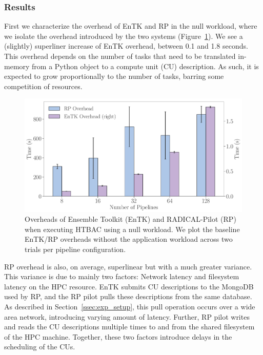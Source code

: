 \subsubsection{Results}\label{ssec:exp_results}

First we characterize the overhead of EnTK and RP in the null workload, where
we isolate the overhead introduced by the two systems
(Figure~\ref{fig:exp1}). We see a (slightly) superliner increase of EnTK
overhead, between 0.1 and 1.8 seconds. This overhead depends on the number of
tasks that need to be translated in-memory from a Python object to a compute
unit (CU) description. As such, it is expected to grow proportionally to the
number of tasks, barring some competition of resources.

\begin{figure}
  \centering
  \includegraphics[width=\columnwidth]{FIGURES/null_workload_overheads.pdf}
  \caption{Overheads of Ensemble Toolkit (EnTK) and RADICAL-Pilot (RP) when
           executing HTBAC using a null workload. We plot the baseline
           EnTK/RP overheads without the application workload across two
           trials per pipeline configuration.}\label{fig:exp1}
\end{figure}

RP overhead is also, on average, superlinear but with a much greater
variance. This variance is due to mainly two factors: Network latency and
filesystem latency on the HPC resource. EnTK submits CU descriptions to the
MongoDB used by RP, and the RP pilot pulls these descriptions from the same
database. As described in Section~\ref{ssec:exp_setup}, this pull operation
occurs over a wide area network, introducing varying amount of latency.
Further, RP pilot writes and reads the CU descriptions multiple times to and
from the shared filesystem of the HPC machine. Together, these two factors
introduce delays in the scheduling of the CUs.

